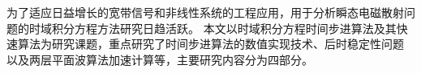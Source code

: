 \pagestyle{frontmatter}
\frontmatter

    \begin{chineseAbstract}
        为了适应日益增长的宽带信号和非线性系统的工程应用，用于分析瞬态电磁散射问题的时域积分方程方法研究日趋活跃。
        本文以时域积分方程时间步进算法及其快速算法为研究课题，重点研究了时间步进算法的数值实现技术、后时稳定性问题
        以及两层平面波算法加速计算等，主要研究内容分为四部分。
            
        
    \end{chineseAbstract}

